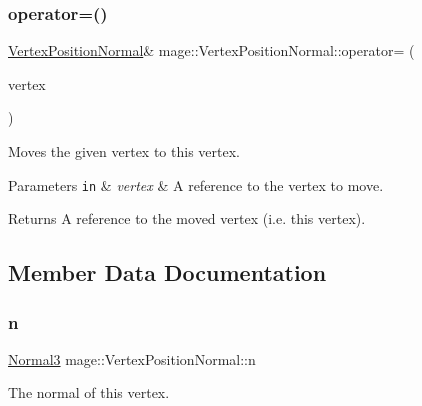 \subsubsection{\texorpdfstring{operator=()}{operator=()}\hspace{0.1cm}{\footnotesize\ttfamily [2/2]}}
{\footnotesize\ttfamily \hyperlink{structmage_1_1_vertex_position_normal}{Vertex\+Position\+Normal}\& mage\+::\+Vertex\+Position\+Normal\+::operator= (\begin{DoxyParamCaption}\item[{\hyperlink{structmage_1_1_vertex_position_normal}{Vertex\+Position\+Normal} \&\&}]{vertex }\end{DoxyParamCaption})\hspace{0.3cm}{\ttfamily [default]}}

Moves the given vertex to this vertex.


\begin{DoxyParams}[1]{Parameters}
\mbox{\tt in}  & {\em vertex} & A reference to the vertex to move. \\
\hline
\end{DoxyParams}
\begin{DoxyReturn}{Returns}
A reference to the moved vertex (i.\+e. this vertex). 
\end{DoxyReturn}


\subsection{Member Data Documentation}
\hypertarget{structmage_1_1_vertex_position_normal_a09baa618081e66e21cdfe5752dbf8df6}{}\label{structmage_1_1_vertex_position_normal_a09baa618081e66e21cdfe5752dbf8df6} 
\subsubsection{\texorpdfstring{n}{n}}
{\footnotesize\ttfamily \hyperlink{structmage_1_1_normal3}{Normal3} mage\+::\+Vertex\+Position\+Normal\+::n}

The normal of this vertex. \hypertarget{structmage_1_1_vertex_position_normal_ac95e9941363ec5687f0bf21e59b83940}{}\label{structmage_1_1_vertex_position_normal_ac95e9941363ec5687f0bf21e59b83940} 
